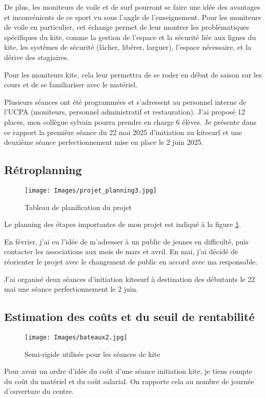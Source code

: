 \documentclass[11pt,a4paper]{report}
\begin{document}
De plus, les moniteurs de voile et de surf pourront se faire une idée des
avantages et inconvénients de ce sport vu sous l'angle de l'enseignement.
Pour les moniteurs de voile en particulier, cet échange permet
de leur montrer les problématiques spécifiques du kite, 
comme la gestion de l'espace et la sécurité liée aux lignes du kite, 
les  systèmes de sécurité 
(lâcher, libérer, larguer), l'espace nécessaire, et la dérive
des stagiaires.

Pour les moniteurs kite, cela leur permettra de se roder en début de
saison sur les cours et de se familiariser avec le matériel.

Plusieurs séances ont été programmées et s'adressent au personnel 
interne de l'UCPA (moniteurs, personnel administratif et
restauration). J'ai  proposé 12 places, mon collègue sylvain
pourra prendre en charge 6 élèves.
Je présente dans ce rapport la première séance du 22 mai 2025 d'initiation 
au kitesurf et une deuxième séance perfectionnement mise en place
le 2 juin 2025.

\subsection{Rétroplanning}
\begin{figure}[h]
\centering
\texttt{[image: Images/projet\_planning3.jpg]} 
\caption{Tableau de planification du projet \label{gantt}}
\end{figure}
Le planning des étapes importantes de mon projet est indiqué
à la figure \ref{gantt}. 

En février, j'ai eu l'idée de m'adresser à un public
de jeunes en difficulté, puis contacter les associations aux mois de mars et avril. 
En mai, j'ai décidé  de  réorienter 
le projet avec le changement de public en accord avec
ma responsable. 

J'ai organisé deux séances d'initiation kitesurf à destination des
débutants le 22 mai une séance perfectionnement le 2 juin. 


\subsection{Estimation des co\^uts et du seuil de rentabilité}

\begin{figure}
\centering
\texttt{[image: Images/bateaux2.jpg]} 
\caption{Semi-rigide utilisés pour les séances de kite\label{bateaux}}
\end{figure}
Pour avoir un ordre d'idée du coût d'une séance initiation kite, je
tiens compte du co\^ut du matériel et du co\^ut salarial. On rapporte 
cela au nombre de journée d'ouverture du centre.
\end{document}
